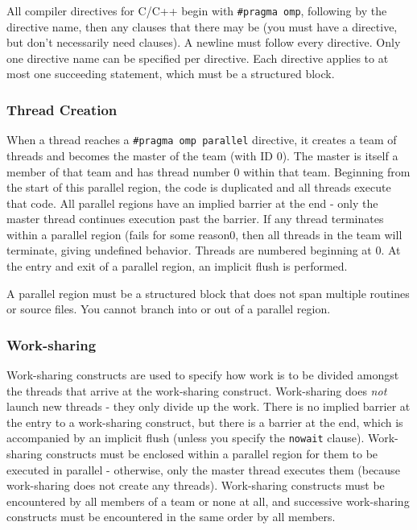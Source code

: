 \documentclass[10pt]{article}
\begin{document}
\begin{flushleft}
All compiler directives for C/C++ begin with {\tt \#pragma omp}, following by the directive name, then any clauses that there may be (you must have a directive, but don't necessarily need clauses). A newline must follow every directive. Only one directive name can be specified per directive. Each directive applies to at most one succeeding statement, which must be a structured block. 

\subsubsection{Thread Creation}

When a thread reaches a {\tt \#pragma omp parallel} directive, it creates a team of threads and becomes the master of the team (with ID 0). The master is itself a member of that team and has thread number 0 within that team. Beginning from the start of this parallel region, the code is duplicated and all threads execute that code. All parallel regions have an implied barrier at the end - only the master thread continues execution past the barrier. If any thread terminates within a parallel region (fails for some reason0, then all threads in the team will terminate, giving undefined behavior. Threads are numbered beginning at 0. At the entry and exit of a parallel region, an implicit flush is performed.

A parallel region must be a structured block that does not span multiple routines or source files. You cannot branch into or out of a parallel region. 

\subsubsection{Work-sharing}

Work-sharing constructs are used to specify how work is to be divided amongst the threads that arrive at the work-sharing construct. Work-sharing does {\it not} launch new threads - they only divide up the work. There is no implied barrier at the entry to a work-sharing construct, but there is a barrier at the end, which is accompanied by an implicit flush (unless you specify the {\tt nowait} clause). Work-sharing constructs must be enclosed within a parallel region for them to be executed in parallel - otherwise, only the master thread executes them (because work-sharing does not create any threads). Work-sharing constructs must be encountered by all members of a team or none at all, and successive work-sharing constructs must be encountered in the same order by all members. 


\end{flushleft}
\end{document}
